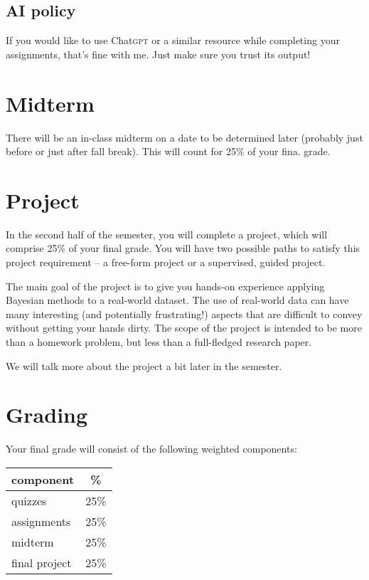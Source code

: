 \documentclass{article}
\newcommand{\acro}[1]{\textsc{\MakeLowercase{#1}}}
\begin{document}
\subsection*{AI policy}

If you would like to use Chat\acro{GPT} or a similar resource while completing
your assignments, that's fine with me. Just make sure you trust its output!

\section*{Midterm}

There will be an in-class midterm on a date to be determined later
(probably just before or just after fall break). This will count for 25\% of your
fina. grade.

\section*{Project}

In the second half of the semester, you will complete a project, which will
comprise 25\% of your final grade.  You will have two possible paths to satisfy
this project requirement -- a free-form project or a supervised, guided project.

The main goal of the project is to give you hands-on experience applying
Bayesian methods to a real-world dataset.  The use of real-world data can have
many interesting (and potentially frustrating!) aspects that are difficult to
convey without getting your hands dirty.  The scope of the project is intended
to be more than a homework problem, but less than a full-fledged research paper.

We will talk more about the project a bit later in the semester.

\section*{Grading}

Your final grade will consist of the following weighted components:
\begin{center}
  \begin{tabular}{lc}
    \toprule
    component                    &   \% \\
    \midrule
    quizzes                      & 25\% \\
    assignments                  & 25\% \\
    midterm                      & 25\% \\
    final project                & 25\% \\
    \bottomrule
  \end{tabular}
\end{center}
\end{document}
